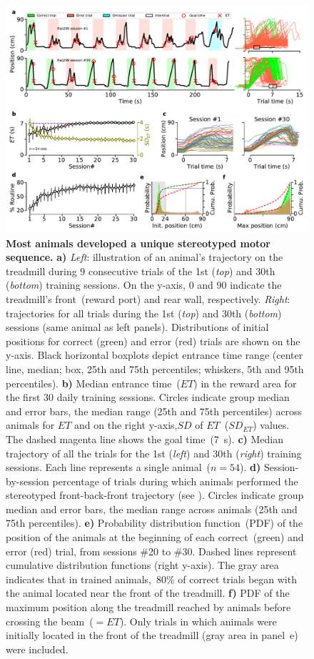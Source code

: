 \begin{figure}[bt!]
    \begin{center}
      \includegraphics[width=.8\linewidth]{ch-time/figures/CtrlTrd.pdf}
      \caption[Control treadmill]
      {\textbf{Most animals developed a unique stereotyped motor sequence.}
      \textbf{a)}
      \textit{Left}: illustration of an animal's trajectory on the treadmill during 9 consecutive trials of the 1st (\textit{top}) and 30th (\textit{bottom}) training sessions.
      On the y-axis, 0 and 90 indicate the treadmill's front~(reward port) and rear wall, respectively.
      \textit{Right}: trajectories for all trials during the 1st (\textit{top}) and 30th (\textit{bottom}) sessions (same animal as left panels).
      Distributions of initial positions for correct (green) and error (red) trials are shown on the y-axis.
      Black horizontal boxplots depict entrance time range (center line, median; box, 25th and 75th percentiles; whiskers, 5th and 95th percentiles).
      \textbf{b)}
      Median entrance time~($ET$) in the reward area for the first 30 daily training sessions.
      Circles indicate group median and error bars, the median range (25th and 75th percentiles) across animals for $ET$ and on the right y-axis,$SD$ of $ET$~($SD_{ET}$) values.
      The dashed magenta line shows the goal time~(7~s).
      \textbf{c)}
      Median trajectory of all the trials for the 1st (\textit{left}) and 30th (\textit{right}) training sessions.
      Each line represents a single animal~($n=54$).
      \textbf{d)}
      Session-by-session percentage of trials during which animals performed the stereotyped front-back-front trajectory (see ).
      Circles indicate group median and error bars, the median range across animals (25th and 75th percentiles).
      \textbf{e)}
      Probability distribution function~(PDF) of the position of the animals at the beginning of each correct~(green) and error (red) trial, from sessions \#20 to \#30.
      Dashed lines represent cumulative distribution functions (right y-axis).
      The gray area indicates that in trained animals,~80\% of correct trials began with the animal located near the front of the treadmill.
      \textbf{f)}
      PDF of the maximum position along the treadmill reached by animals before crossing the beam~($=ET$).
      Only trials in which animals were initially located in the front of the treadmill (gray area in panel~e) were included.
    }
    \label{fig:time:CtrlTrd}
    \end{center}
  \end{figure}